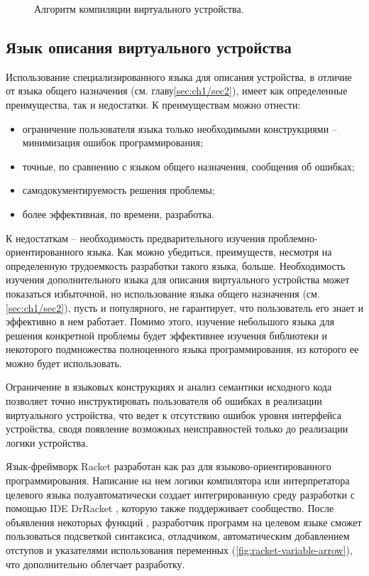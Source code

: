 \begin{figure}[!htbp]
    \centering
    
    \caption{Алгоритм компиляции виртуального устройства.}\label{fig:device-compilation}
\end{figure}


\subsection{Язык описания виртуального устройства}\label{sec:ch2/sec1/sub1}

Использование специализированного языка для описания устройства, в отличие от языка общего назначения (см. главу\cref{sec:ch1/sec2}),
имеет как определенные преимущества, так и недостатки.
К преимуществам можно отнести:
\begin{itemize}
    \item ограничение пользователя языка только необходимыми конструкциями -- минимизация ошибок программирования;
    \item точные, по сравнению с языком общего назначения, сообщения об ошибках;
    \item самодокументируемость решения проблемы;
    \item более эффективная, по времени, разработка.
\end{itemize}

К недостаткам -- необходимость предварительного изучения проблемно-ориентированного языка.
Как можно убедиться, преимуществ, несмотря на определенную трудоемкость разработки такого языка,
больше.
Необходимость изучения дополнительного языка для описания виртуального устройства может показаться
избыточной, но использование языка общего назначения (см.\cref{sec:ch1/sec2}),
пусть и популярного, не гарантирует, что пользователь его знает и эффективно в нем работает.
Помимо этого, изучение небольшого языка для решения конкретной проблемы будет эффективнее
изучения библиотеки и некоторого подмножества полноценного языка программирования,
из которого ее можно будет использовать.

Ограничение в языковых конструкциях и анализ семантики исходного кода
позволяет точно инструктировать пользователя об ошибках в реализации виртуального устройства,
что ведет к отсутствию ошибок уровня интерфейса устройства,
сводя появление возможных неисправностей только до реализации логики устройства.

Язык-фреймворк Racket \cite{racket-lang} разработан как раз для языково-ориентированного
программирования. Написание на нем логики компилятора или интерпретатора целевого языка
полуавтоматически создает интегрированную среду разработки с помощью IDE DrRacket \cite{drracket}, которую
также поддерживает сообщество.
После объявления некоторых функций \cite{racket-drracket-integration}, разработчик программ
на целевом языке сможет пользоваться подсветкой синтаксиса, отладчиком, автоматическим добавлением
отступов и указателями использования переменных (\cref{fig:racket-variable-arrow}), что дополнительно облегчает разработку.

